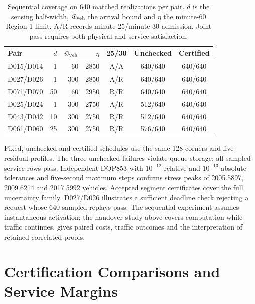 \begin{table}[t]
\centering\small
\caption{Sequential coverage on 640 matched realizations per pair.
$d$ is the sensing half-width, $\bar w_{\rm veh}$ the arrival bound and
$\eta$ the minute-60 Region-1 limit. A/R records minute-25/minute-30
admission. Joint pass requires both physical and service satisfaction.}
\label{tab:supp-sequential-coverage}
\setlength{\tabcolsep}{4pt}
\begin{tabular}{@{}lrrrccc@{}}
\toprule
Pair & $d$ & $\bar w_{\rm veh}$ & $\eta$ & 25/30 & Unchecked & Certified\\
\midrule
D015/D014 & 1 & 60 & 2850 & A/A & 640/640 & 640/640\\
D027/D026 & 1 & 300 & 2850 & A/R & 640/640 & 640/640\\
D071/D070 & 50 & 60 & 2950 & R/R & 640/640 & 640/640\\
D025/D024 & 1 & 300 & 2750 & A/R & 512/640 & 640/640\\
D043/D042 & 10 & 300 & 2750 & R/R & 512/640 & 640/640\\
D061/D060 & 25 & 300 & 2750 & R/R & 576/640 & 640/640\\
\bottomrule
\end{tabular}
\end{table}

Fixed, unchecked and certified schedules use the same 128 corners and five
residual profiles. The three unchecked failures violate queue storage;
all sampled service rows pass. Independent DOP853 with $10^{-12}$ relative
and $10^{-13}$ absolute tolerances and five-second maximum steps confirms
stress peaks of 2005.5897, 2009.6214 and 2017.5992 vehicles. Accepted segment
certificates cover the full uncertainty family. D027/D026 illustrates a
sufficient deadline check rejecting a request whose 640 sampled replays
pass. The sequential experiment assumes instantaneous activation; the
handover study above covers computation while traffic continues.
 gives paired costs, traffic outcomes and
the interpretation of retained correlated proofs.

\FloatBarrier
\section{Certification Comparisons and Service Margins}
\label{sec:supp-structure}
\label{app:structure-online-details}


